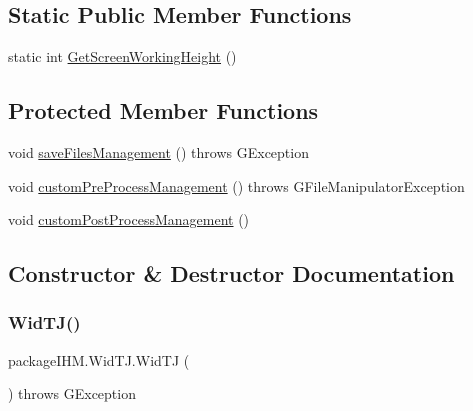 \subsection*{Static Public Member Functions}
\begin{DoxyCompactItemize}
\item 
static int \mbox{\hyperlink{classpackage_i_h_m_1_1_wid_t_j_ab5d6a2f12395afe471013846630aefad}{Get\+Screen\+Working\+Height}} ()
\end{DoxyCompactItemize}
\subsection*{Protected Member Functions}
\begin{DoxyCompactItemize}
\item 
void \mbox{\hyperlink{classpackage_i_h_m_1_1_wid_t_j_a94b1d75f96ce723aa706906f8a47efbf}{save\+Files\+Management}} ()  throws G\+Exception 
\item 
void \mbox{\hyperlink{classpackage_i_h_m_1_1_wid_t_j_a564dc6bfdb5f4bddbb9c3039ca0fb94d}{custom\+Pre\+Process\+Management}} ()  throws G\+File\+Manipulator\+Exception 
\item 
void \mbox{\hyperlink{classpackage_i_h_m_1_1_wid_t_j_a68ac9fee9a64a7fa20e721ecef5438c5}{custom\+Post\+Process\+Management}} ()
\end{DoxyCompactItemize}


\subsection{Constructor \& Destructor Documentation}
\mbox{\label{classpackage_i_h_m_1_1_wid_t_j_a91eaa9ba3a133dee647a5055d255c2d5}} 
\subsubsection{\texorpdfstring{Wid\+T\+J()}{WidTJ()}}
{\footnotesize\ttfamily package\+I\+H\+M.\+Wid\+T\+J.\+Wid\+TJ (\begin{DoxyParamCaption}{ }\end{DoxyParamCaption}) throws G\+Exception}

